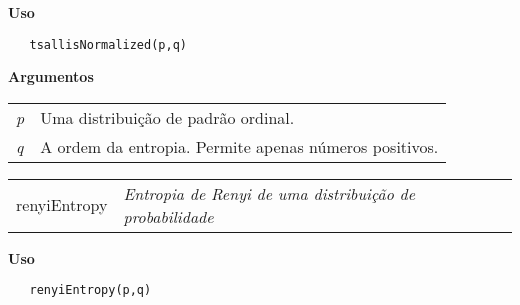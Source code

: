 \documentclass[12pt,letterpaper]{article}
\begin{document}
\textbf{Uso}

\begin{lstlisting}
   tsallisNormalized(p,q)
\end{lstlisting}

\vspace{0.5cm}

\textbf{Argumentos}

\begin{table}[!h]
\begin{center}
\begin{tabularx}{\textwidth}{X X}
\hspace{0.5cm} \textit{p} \vspace{0.5cm}& Uma distribuição de padrão ordinal.\vspace{0.5cm}\\
\hspace{0.5cm} \textit{q} \vspace{0.5cm}&  A ordem da entropia. Permite apenas números positivos.\vspace{0.5cm}\\
\end{tabularx}
\end{center}
\end{table} 


\hrulefill   

\begin{table}[!h]
\begin{center}
\begin{tabularx}{\textwidth}{ X X}
\hspace{0.5cm} renyiEntropy & \textit{Entropia de Renyi de uma distribuição de probabilidade}\\
\end{tabularx}
\end{center}
\end{table} 

\vspace{-0.5cm}

\hrulefill  

\vspace{0.5cm}

\textbf{Uso}

\begin{lstlisting}
   renyiEntropy(p,q)
\end{lstlisting}

\vspace{0.5cm}
\end{document}
